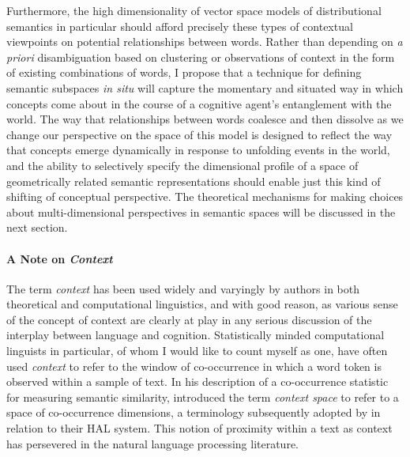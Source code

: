 Furthermore, the high dimensionality of vector space models of distributional semantics in particular should afford precisely these types of contextual viewpoints on potential relationships between words.  Rather than depending on \emph{a priori} disambiguation based on clustering or observations of context in the form of existing combinations of words, I propose that a technique for defining semantic subspaces \emph{in situ} will capture the momentary and situated way in which concepts come about in the course of a cognitive agent's entanglement with the world.  The way that relationships between words coalesce and then dissolve as we change our perspective on the space of this model is designed to reflect the way that concepts emerge dynamically in response to unfolding events in the world, and the ability to selectively specify the dimensional profile of a space of geometrically related semantic representations should enable just this kind of shifting of conceptual perspective.  The theoretical mechanisms for making choices about multi-dimensional perspectives in semantic spaces will be discussed in the next section.

\paragraph{A Note on \emph{Context}} The term \emph{context} has been used widely and varyingly by authors in both theoretical and computational linguistics, and with good reason, as various sense of the concept of context are clearly at play in any serious discussion of the interplay between language and cognition.  Statistically minded computational linguists in particular, of whom I would like to count myself as one, have often used \emph{context} to refer to the window of co-occurrence in which a word token is observed within a sample of text.  In his description of a co-occurrence statistic for measuring semantic similarity, \cite{Schutze1992b} introduced the term \emph{context space} to refer to a space of co-occurrence dimensions, a terminology subsequently adopted by \cite{BurgessEA1997} in relation to their HAL system.  This notion of proximity within a text as context has persevered in the natural language processing literature.

